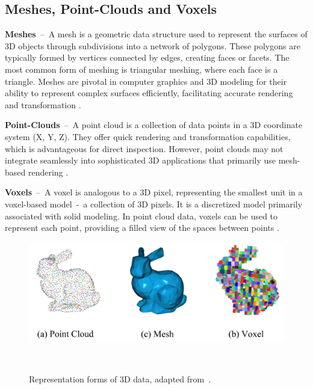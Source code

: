 \subsection{Meshes, Point-Clouds and Voxels}\label{MPCV}

\textbf{Meshes}~--~A mesh is a geometric data structure used to represent the surfaces of 3D objects through subdivisions into a network of polygons. These polygons are typically formed by vertices connected by edges, creating faces or facets. The most common form of meshing is triangular meshing, where each face is a triangle. Meshes are pivotal in computer graphics and 3D modeling for their ability to represent complex surfaces efficiently, facilitating accurate rendering and transformation \citep{lahav2020meshwalker, Zhang_2023}.

\textbf{Point-Clouds}~--~A point cloud is a collection of data points in a 3D coordinate system (X, Y, Z). They offer quick rendering and transformation capabilities, which is advantageous for direct inspection. However, point clouds may not integrate seamlessly into sophisticated 3D applications that primarily use mesh-based rendering \citep{voxels, Zhang_2023}.

\textbf{Voxels}~--~A voxel is analogous to a 3D pixel, representing the smallest unit in a voxel-based model~-~a collection of 3D pixels. It is a discretized model primarily associated with solid modeling. In point cloud data, voxels can be used to represent each point, providing a filled view of the spaces between points \citep{voxels, Zhang_2023}.

\begin{figure}[H]
    \centering
      \includegraphics[width=.8\columnwidth]{figures/mpcv.png}
      \caption{Representation forms of 3D data, adapted from~\cite{Zhang_2023}.}~\label{fig:mpcv}
\end{figure}
